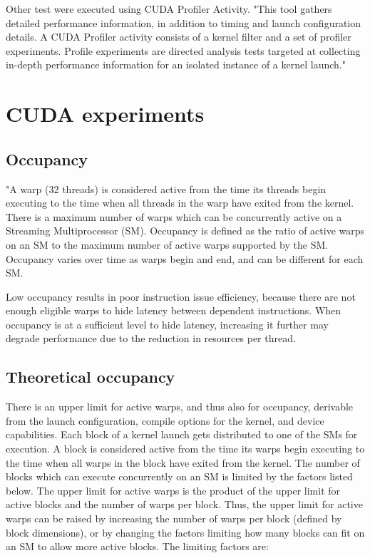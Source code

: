 \documentclass[oneside,openright,12pt,final,en]{mgr}
\begin{document}
Other test were executed using CUDA Profiler Activity. "This tool gathers detailed performance information, in addition to timing and launch configuration details. A CUDA Profiler activity consists of a kernel filter and a set of profiler experiments. Profile experiments are directed analysis tests targeted at collecting in-depth performance information for an isolated instance of a kernel launch."\cite{nsight}

\section{CUDA experiments}

\subsection{Occupancy}
"A warp (32 threads) is considered active from the time its threads begin executing to the time when all threads in the warp have exited from the kernel. There is a maximum number of warps which can be concurrently active on a Streaming Multiprocessor (SM). Occupancy is defined as the ratio of active warps on an SM to the maximum number of active warps supported by the SM. Occupancy varies over time as warps begin and end, and can be different for each SM.

Low occupancy results in poor instruction issue efficiency, because there are not enough eligible warps to hide latency between dependent instructions. When occupancy is at a sufficient level to hide latency, increasing it further may degrade performance due to the reduction in resources per thread.

\subsection{Theoretical occupancy}
There is an upper limit for active warps, and thus also for occupancy, derivable from the launch configuration, compile options for the kernel, and device capabilities. Each block of a kernel launch gets distributed to one of the SMs for execution. A block is considered active from the time its warps begin executing to the time when all warps in the block have exited from the kernel. The number of blocks which can execute concurrently on an SM is limited by the factors listed below. The upper limit for active warps is the product of the upper limit for active blocks and the number of warps per block. Thus, the upper limit for active warps can be raised by increasing the number of warps per block (defined by block dimensions), or by changing the factors limiting how many blocks can fit on an SM to allow more active blocks. The limiting factors are:
\end{document}
